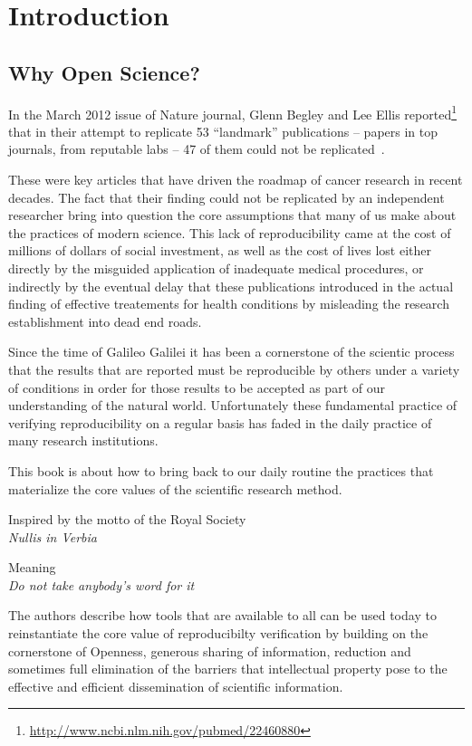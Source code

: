 \chapter{Introduction}

\section{Why Open Science?}

In the March 2012 issue of Nature journal, Glenn Begley and Lee Ellis
reported\footnote{\url{http://www.ncbi.nlm.nih.gov/pubmed/22460880}} that in
their attempt to replicate 53 ``landmark'' publications -- papers in top
journals, from reputable labs -- 47 of them could not be
replicated~\cite{Begley2012}.

These were key articles that have driven the roadmap of cancer research in
recent decades. The fact that their finding could not be replicated by an
independent researcher bring into question the core assumptions that many of us
make about the practices of modern science. This lack of reproducibility came
at the cost of millions of dollars of social investment, as well as the cost of
lives lost either directly by the misguided application of inadequate medical
procedures, or indirectly by the eventual delay that these publications
introduced in the actual finding of effective treatements for health conditions
by misleading the research establishment into dead end roads.

Since the time of Galileo Galilei it has been a cornerstone of the scientic
process that the results that are reported must be reproducible by others under
a variety of conditions in order for those results to be accepted as part of
our understanding of the natural world. Unfortunately these fundamental
practice of verifying reproducibility on a regular basis has faded in the daily
practice of many research institutions.

This book is about how to bring back to our daily routine the practices that
materialize the core values of the scientific research method.

Inspired by the motto of the Royal Society\\

\emph{Nullis in Verbia}

Meaning\\

\emph{Do not take anybody's word for it}

The authors describe how tools that are available to all can be used today to
reinstantiate the core value of reproducibilty verification by building on the
cornerstone of Openness, generous sharing of information, reduction and
sometimes full elimination of the barriers that intellectual property pose to
the effective and efficient dissemination of scientific information.

